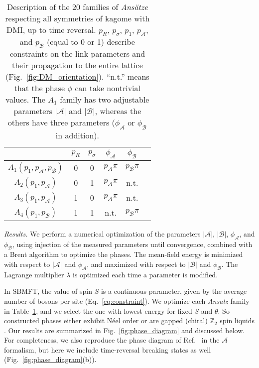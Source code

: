\documentclass[aps,prl,twocolumn,superscriptaddress,showpacs,a4paper, longbibliography]{revtex4-1}
\begin{document}
\begin{table}
\renewcommand{\arraystretch}{1.1}
\begin{center}
 \begin{tabular}{|c||c|c|c|c|c|}
\hline
 & $p_R$ & $p_\sigma$ & $\phi_{\mathcal A}$ & $\phi_{\mathcal B}$\\
\hline
\hline
$A_1(p_1,p_{\mathcal A},p_{\mathcal B})$ &0 &0 &$p_{\mathcal A}\pi$ &$p_{\mathcal B}\pi$
%
\\
$A_2(p_1,p_{\mathcal A})$ &0 &1 &$p_{\mathcal A}\pi$ &n.t.
%
\\
$A_3(p_1,p_{\mathcal A})$ &1 &0 &$p_{\mathcal A}\pi$ &n.t.
%
\\
$A_4(p_1,p_{\mathcal B})$ &1 &1 &n.t.&$p_{\mathcal B}\pi$
\\
\hline
 \end{tabular}
\caption{\label{tab:Ansaetze}
Description of the 20 families of \textit{Ans\"atze} respecting all symmetries of kagome with DMI, up to time reversal.
$p_R$, $p_\sigma$, $p_1$, $p_{\mathcal A}$, and $p_{\mathcal B}$ (equal to 0 or 1) describe constraints on
the link parameters and their propagation to the entire lattice (Fig.~\ref{fig:DM_orientation}).
``n.t.'' means that the phase $\phi$ can take nontrivial values. The $A_1$ family has two adjustable parameters $|\mathcal A|$ and $|\mathcal B|$, whereas the others have three parameters ($\phi_{\mathcal A}$ or $\phi_{\mathcal B}$ in addition).
}
\end{center}
\end{table}


{\it Results.} We perform a numerical optimization of the parameters $|\mathcal A|$, $|\mathcal B|$, $\phi_{\mathcal A}$, and $\phi_{\mathcal B}$, using injection of the measured parameters until convergence, combined with a Brent algorithm to optimize the phases.
The mean-field energy is minimized with respect to $|\mathcal A|$ and $\phi_{\mathcal A}$, and maximized with respect to $|\mathcal B|$ and $\phi_{\mathcal B}$.
The Lagrange multiplier $\lambda$ is optimized each time a parameter is modified.

In SBMFT, the value of spin $S$ is a continuous parameter, given by the average number of bosons per site (Eq.~\eqref{eq:constraint}).
We optimize each \textit{Ansatz} family in Table~\ref{tab:Ansaetze}, and we select the one with lowest energy for fixed $S$ and $\theta$.
So constructed phases either exhibit N\'eel order or are gapped (chiral) $\mathbb Z_2$ spin liquids \cite{suppMat}.
Our results are summarized in Fig.~\ref{fig:phase_diagram} and discussed below.
For completeness, we also reproduce the phase diagram of Ref.~\cite{Moi_DM} in the $\mathcal A$ formalism, but here we include time-reversal breaking states as well (Fig.~\ref{fig:phase_diagram}(b)).
\end{document}
